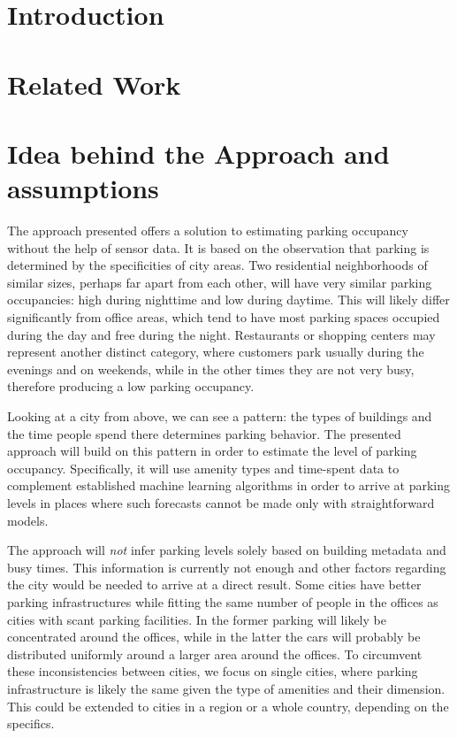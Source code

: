 \documentclass{ws-ijait}
\begin{document}
	\section{Introduction}
	
	\section{Related Work}

	\section{Idea behind the Approach and assumptions}
	The approach presented offers a solution to estimating parking occupancy without the help of sensor data. It is based on the observation that parking is determined by the specificities of city areas. Two residential neighborhoods of similar sizes, perhaps far apart from each other, will have very similar parking occupancies: high during nighttime and low during daytime. This will likely differ significantly from office areas, which tend to have most parking spaces occupied during the day and free during the night. Restaurants or shopping centers may represent another distinct category, where customers park usually during the evenings and on weekends, while in the other times they are not very busy, therefore producing a low parking occupancy.
	
	Looking at a city from above, we can see a pattern: the types of buildings and the time people spend there determines parking behavior. The presented approach will build on this pattern in order to estimate the level of parking occupancy. Specifically, it will use amenity types and time-spent data to complement established machine learning algorithms in order to arrive at parking levels in places where such forecasts cannot be made only with straightforward models.
	
	The approach will \textit{not} infer parking levels solely based on building metadata and busy times. This information is currently not enough and other factors regarding the city would be needed to arrive at a direct result. Some cities have better parking infrastructures while fitting the same number of people in the offices as cities with scant parking facilities. In the former parking will likely be concentrated around the offices, while in the latter the cars will probably be distributed uniformly around a larger area around the offices. To circumvent these inconsistencies between cities, we focus on single cities, where parking infrastructure is likely the same given the type of amenities and their dimension. This could be extended to cities in a region or a whole country, depending on the specifics.
	
\end{document}
